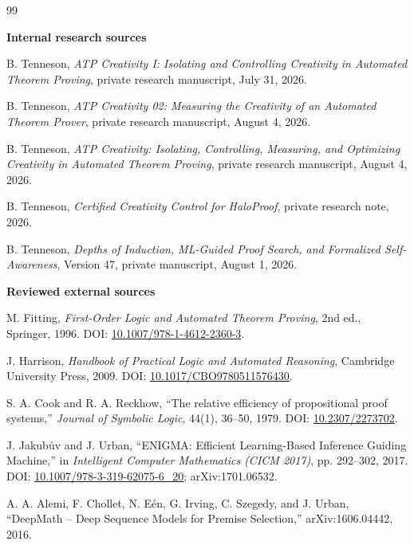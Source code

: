 \documentclass[11pt]{article}
\theoremstyle{datatheorem}
\theoremstyle{definition}
\begin{document}
\begin{thebibliography}{99}

\item[]\textbf{Internal research sources}

B. Tenneson, \emph{ATP Creativity I: Isolating and Controlling Creativity in Automated Theorem Proving}, private research manuscript, July 31, 2026.

B. Tenneson, \emph{ATP Creativity 02: Measuring the Creativity of an Automated Theorem Prover}, private research manuscript, August 4, 2026.

B. Tenneson, \emph{ATP Creativity: Isolating, Controlling, Measuring, and Optimizing Creativity in Automated Theorem Proving}, private research manuscript, August 4, 2026.

B. Tenneson, \emph{Certified Creativity Control for HaloProof}, private research note, 2026.

B. Tenneson, \emph{Depths of Induction, ML-Guided Proof Search, and Formalized Self-Awareness}, Version 47, private manuscript, August 1, 2026.

\item[]\textbf{Reviewed external sources}

M. Fitting, \emph{First-Order Logic and Automated Theorem Proving}, 2nd ed., Springer, 1996. DOI: \href{https://doi.org/10.1007/978-1-4612-2360-3}{10.1007/978-1-4612-2360-3}.

J. Harrison, \emph{Handbook of Practical Logic and Automated Reasoning}, Cambridge University Press, 2009. DOI: \href{https://doi.org/10.1017/CBO9780511576430}{10.1017/CBO9780511576430}.

S. A. Cook and R. A. Reckhow, ``The relative efficiency of propositional proof systems,'' \emph{Journal of Symbolic Logic}, 44(1), 36--50, 1979. DOI: \href{https://doi.org/10.2307/2273702}{10.2307/2273702}.

J. Jakub\r{u}v and J. Urban, ``ENIGMA: Efficient Learning-Based Inference Guiding Machine,'' in \emph{Intelligent Computer Mathematics (CICM 2017)}, pp. 292--302, 2017. DOI: \href{https://doi.org/10.1007/978-3-319-62075-6_20}{10.1007/978-3-319-62075-6\_20}; arXiv:1701.06532.

A. A. Alemi, F. Chollet, N. E\'en, G. Irving, C. Szegedy, and J. Urban, ``DeepMath -- Deep Sequence Models for Premise Selection,'' arXiv:1606.04442, 2016.


\end{thebibliography}
\end{document}
